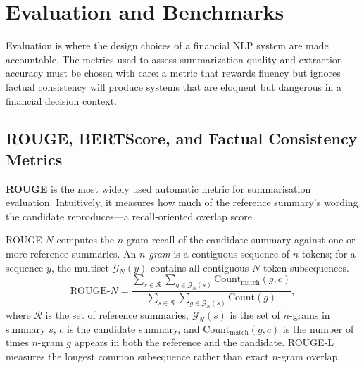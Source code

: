 \section{Evaluation and Benchmarks}
\label{sec:ch14-evaluation-benchmarks}

Evaluation is where the design choices of a financial NLP system are made accountable.
The metrics used to assess summarization quality and extraction accuracy must be chosen
with care: a metric that rewards fluency but ignores factual consistency will produce
systems that are eloquent but dangerous in a financial decision context.

\subsection{ROUGE, BERTScore, and Factual Consistency Metrics}
\label{sec:ch14-rouge-bertscore-metrics}

\begin{context}
\textbf{ROUGE} \citep{lin2004rouge} is the most widely used automatic metric for
summarisation evaluation. Intuitively, it measures how much of the reference summary's
wording the candidate reproduces---a recall-oriented overlap score.
\end{context}

\begin{deepdive}
ROUGE-$N$ computes the $n$-gram recall of the candidate summary against one or more
reference summaries. An \emph{$n$-gram} is a contiguous sequence of $n$ tokens; for a
sequence $y$, the multiset $\mathcal{G}_N(y)$ contains all contiguous $N$-token subsequences.
\begin{equation}
\label{eq:rouge-n}
\text{ROUGE-}N = \frac{\sum_{s \in \mathcal{R}} \sum_{g \in \mathcal{G}_N(s)}
  \text{Count}_{\text{match}}(g, c)}{\sum_{s \in \mathcal{R}} \sum_{g \in \mathcal{G}_N(s)}
  \text{Count}(g)},
\end{equation}
where $\mathcal{R}$ is the set of reference summaries, $\mathcal{G}_N(s)$ is the set
of $n$-grams in summary $s$, $c$ is the candidate summary, and $\text{Count}_{\text{match}}(g, c)$
is the number of times $n$-gram $g$ appears in both the reference and the candidate.
ROUGE-L measures the longest common subsequence rather than exact $n$-gram overlap.
\end{deepdive}


